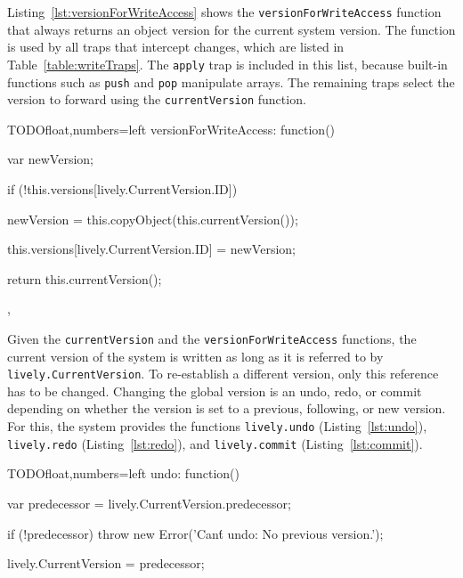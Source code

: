 
Listing~\ref{lst:versionForWriteAccess} shows the \lstinline{versionForWriteAccess} function that always returns an object version for the current system version.
The function is used by all traps that intercept changes, which are listed in Table~\ref{table:writeTraps}.
The \lstinline{apply} trap is included in this list, because built-in functions such as \lstinline{push} and \lstinline{pop} manipulate arrays.
The remaining traps select the version to forward using the \lstinline{currentVersion} function.

\begin{code}{TODO}{float,numbers=left}
versionForWriteAccess: function() {
    var newVersion;
    
    if (!this.versions[lively.CurrentVersion.ID]) {
        newVersion = this.copyObject(this.currentVersion());
        
        this.versions[lively.CurrentVersion.ID] = newVersion;
    }
    
    return this.currentVersion();
},
\end{code}
\iffalse
\end{verbatim}\fi

Given the \lstinline{currentVersion} and the \lstinline{versionForWriteAccess} functions, the current version of the system is written as long as it is referred to by \lstinline{lively.CurrentVersion}.
To re-establish a different version, only this reference has to be changed.
Changing the global version is an undo, redo, or commit depending on whether the version is set to a previous, following, or new version.
For this, the system provides the functions \lstinline{lively.undo} (Listing~\ref{lst:undo}), \lstinline{lively.redo} (Listing~\ref{lst:redo}), and \lstinline{lively.commit} (Listing~\ref{lst:commit}).

\begin{code}{TODO}{float,numbers=left}
undo: function() {
    var predecessor = lively.CurrentVersion.predecessor;
    
    if (!predecessor) {
        throw new Error('Can\'t undo: No previous version.');
    }
    
    lively.CurrentVersion = predecessor;
}
\end{code}
\iffalse
\end{verbatim}\fi

